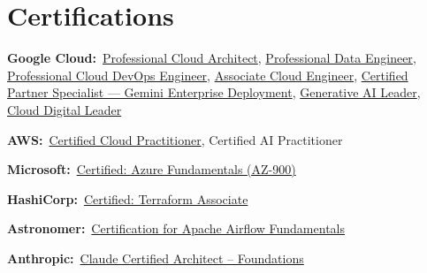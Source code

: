 \documentclass[11pt,letterpaper]{article}
\newcommand{\row}[2]{\par\noindent\textbf{#1:}\ #2\par\vspace{1.5pt}}
\begin{document}
\section{Certifications}
\row{Google Cloud}{\href{https://www.credly.com/badges/e49df6ba-8768-4756-82ad-92c8900b8a81/public_url}{Professional Cloud Architect}, \href{https://www.credly.com/badges/4ce10b30-39e6-4e2f-8f89-bfa9fa81af7d/public_url}{Professional Data Engineer}, \href{https://www.credly.com/earner/earned/share/cd317e68-818d-4336-8720-e12c6ff3fee7}{Professional Cloud DevOps Engineer}, \href{https://credential.net/675b715d-d013-479c-a3e9-5caf78ef987a?key=283a0473e3fc51622d2fae2fb00b2e002859c6404021ee6c5d281df64df0205d}{Associate Cloud Engineer}, \href{https://www.credly.com/badges/a9dfd998-5247-4630-8ed7-868e61653f37/public_url}{Certified Partner Specialist --- Gemini Enterprise Deployment}, \href{https://www.credly.com/badges/a2ef557f-34b5-452e-8b09-ef786df1ee2a}{Generative AI Leader}, \href{https://www.credly.com/badges/4391fd42-ab30-4155-91e7-88160b8847a5}{Cloud Digital Leader}}
\row{AWS}{\href{https://www.credly.com/badges/8a66812d-63bd-4e3c-a2ff-5067f1a27321}{Certified Cloud Practitioner}, Certified AI Practitioner}
\row{Microsoft}{\href{https://www.credly.com/badges/4cea8e7b-a364-425d-9da6-08aa5e92c1e0}{Certified: Azure Fundamentals (AZ-900)}}
\row{HashiCorp}{\href{https://www.credly.com/badges/bd2eeffd-66a7-4767-9958-6024c00c4f06/public_url}{Certified: Terraform Associate}}
\row{Astronomer}{\href{https://www.credly.com/badges/3b6ee162-1f2e-4d6e-9385-0d6929f35441}{Certification for Apache Airflow Fundamentals}}
\row{Anthropic}{\href{https://verify.skilljar.com/c/vjo8xynofbsp}{Claude Certified Architect -- Foundations}}
\end{document}
